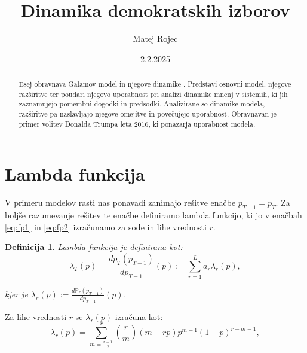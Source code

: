 \documentclass[a4paper,12pt]{article}
\title{Dinamika demokratskih izborov}
\author{Matej Rojec}
\date{2.2.2025}
\newtheorem{definicija}{Definicija}}
\newcommand{\p}{\mathbb{P}}
\newcommand{\lam}[1]{\lambda_{#1}(p)}
\begin{document}
\maketitle
\begin{abstract}
    Esej obravnava Galamov model in njegove dinamike \cite{galam2015stubbornness,galam2016trump,galam2020tipping}. 
Predstavi osnovni model, njegove razširitve ter poudari njegovo uporabnost pri 
analizi dinamike mnenj v sistemih, ki jih zaznamujejo pomembni dogodki in predsodki. 
Analizirane so dinamike modela, razširitve pa naslavljajo njegove omejitve in 
povečujejo uporabnost. Obravnavan je primer volitev Donalda Trumpa leta 2016, 
ki ponazarja uporabnost modela.
\end{abstract}

\section*{Lambda funkcija}

V primeru modelov rasti nas ponavadi zanimajo rešitve enačbe $p_{T-1}=p_{T}$.
Za boljše razumevanje rešitev te enačbe definiramo lambda funkcijo,
ki jo v enačbah \ref{eq:fp1} in \ref{eq:fp2} izračunamo za sode in lihe vrednosti $r$.

\begin{definicija}
    Lambda funkcija je definirana kot:
    \begin{equation}
    \lambda_T(p) = \frac{dp_{T}(p_{T-1})}{dp_{T-1}}(p) := \sum_{r=1}^L a_r \lambda_r(p),
    \end{equation}

    kjer je $\lambda_r(p) := \frac{d\p_{r}(p_{T-1})}{dp_{T-1}}(p)$.
\end{definicija}

Za lihe vrednosti $r$ se $\lam{r}$ izračuna kot: 
\begin{equation} \label{eq:fp1}
    \lambda_r(p) = \sum_{m=\frac{r+1}{2}}^r \binom{r}{m} (m-rp) p^{m-1} (1-p)^{r-m-1},
\end{equation}
\end{document}
